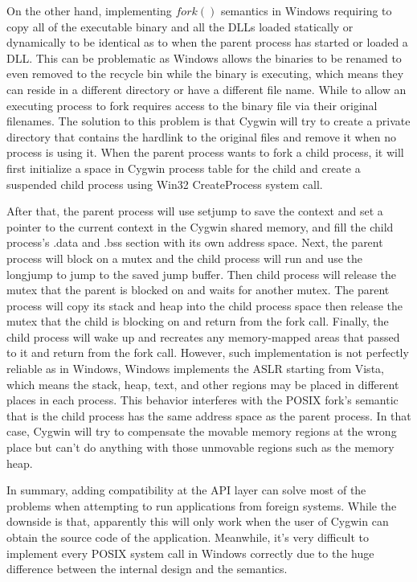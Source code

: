 On the other hand, implementing $fork()$ semantics in Windows requiring to copy all of the executable binary and all the DLLs loaded statically or dynamically to be identical as to when the parent process has started or loaded a DLL. This can be problematic as Windows allows the binaries to be renamed to even removed to the recycle bin while the binary is executing, which means they can reside in a different directory or have a different file name. While to allow an executing process to fork requires access to the binary file via their original filenames. The solution to this problem is that Cygwin will try to create a private directory that contains the hardlink to the original files and remove it when no process is using it. When the parent process wants to fork a child process, it will first initialize a space in Cygwin process table for the child and create a suspended child process using Win32 CreateProcess system call. 

After that, the parent process will use setjump to save the context and set a pointer to the current context in the Cygwin shared memory, and fill the child process's .data and .bss section with its own address space. Next, the parent process will block on a mutex and the child process will run and use the longjump to jump to the saved jump buffer. Then child process will release the mutex that the parent is blocked on and waits for another mutex. The parent process will copy its stack and heap into the child process space then release the mutex that the child is blocking on and return from the fork call. Finally, the child process will wake up and recreates any memory-mapped areas that passed to it and return from the fork call. However, such implementation is not perfectly reliable as in Windows, Windows implements the ASLR starting from Vista, which means the stack, heap, text, and other regions may be placed in different places in each process. This behavior interferes with the POSIX fork's semantic that is the child process has the same address space as the parent process. In that case, Cygwin will try to compensate the movable memory regions at the wrong place but can't do anything with those unmovable regions such as the memory heap.

In summary, adding compatibility at the API layer can solve most of the problems when attempting to run applications from foreign systems. While the downside is that, apparently this will only work when the user of Cygwin can obtain the source code of the application. Meanwhile, it's very difficult to implement every POSIX system call in Windows correctly due to the huge difference between the internal design and the semantics. 

